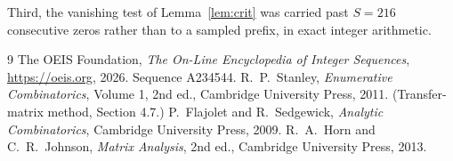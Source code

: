 \documentclass[11pt,a4paper]{article}
\theoremstyle{plain}
\theoremstyle{definition}
\begin{document}
Third, the vanishing test of Lemma~\ref{lem:crit} was carried past $S=216$ consecutive
zeros rather than to a sampled prefix, in exact integer arithmetic.

\begin{thebibliography}{9}
 The OEIS Foundation, \emph{The On-Line Encyclopedia of Integer
Sequences}, \url{https://oeis.org}, 2026. Sequence A234544.
 R.~P.~Stanley, \emph{Enumerative Combinatorics}, Volume 1, 2nd ed.,
Cambridge University Press, 2011. (Transfer-matrix method, Section 4.7.)
 P.~Flajolet and R.~Sedgewick, \emph{Analytic Combinatorics}, Cambridge
University Press, 2009.
 R.~A.~Horn and C.~R.~Johnson, \emph{Matrix Analysis}, 2nd ed., Cambridge
University Press, 2013.
\end{thebibliography}
\end{document}
